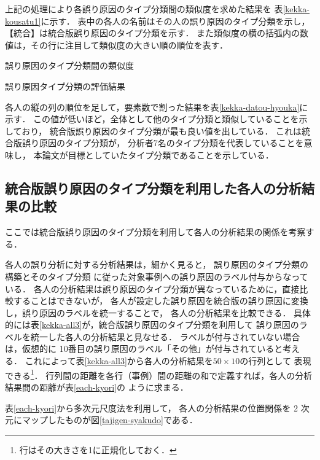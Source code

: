 \documentclass[japanese]{jnlp_1.4}
\begin{document}
上記の処理により各誤り原因のタイプ分類間の類似度を求めた結果を
\mbox{表\ref{kekka-kousatu1}}に示す．
表中の各人の名前はその人の誤り原因のタイプ分類を示し，【統合】は統合版誤り原因のタイプ分類を示す．
また類似度の横の括弧内の数値は，その行に注目して類似度の大きい順の順位を表す．


\begin{table}[t]
\caption{誤り原因のタイプ分類間の類似度}
\label{kekka-kousatu1}

\end{table}
\begin{table}[t]
\caption{誤り原因タイプ分類の評価結果}
\label{kekka-datou-hyouka}

\end{table}

各人の縦の列の順位を足して，要素数で割った結果を\mbox{表\ref{kekka-datou-hyouka}}に示す．
この値が低いほど，全体として他のタイプ分類と類似していることを示しており，
統合版誤り原因のタイプ分類が最も良い値を出している．
これは統合版誤り原因のタイプ分類が，
分析者7名のタイプ分類を代表していることを意味し，
本論文が目標としていたタイプ分類であることを示している．


\subsection{統合版誤り原因のタイプ分類を利用した各人の分析結果の比較}

ここでは統合版誤り原因のタイプ分類を利用して各人の分析結果の関係を考察する．

各人の誤り分析に対する分析結果は，細かく見ると，
誤り原因のタイプ分類の構築とそのタイプ分類
に従った対象事例への誤り原因のラベル付与からなっている．
各人の分析結果は誤り原因のタイプ分類が異なっているために，直接比較することはできないが，
各人が設定した誤り原因を統合版の誤り原因に変換し，誤り原因のラベルを統一することで，
各人の分析結果を比較できる．
具体的には\mbox{表\ref{kekka-all3}}が，統合版誤り原因のタイプ分類を利用して
誤り原因のラベルを統一した各人の分析結果と見なせる．
ラベルが付与されていない場合は，仮想的に 10番目の誤り原因のラベル「その他」が付与されていると考える．
これによって\mbox{表\ref{kekka-all3}}から各人の分析結果を$50 \times 10$の行列として
表現できる\footnote{行はその大きさを1に正規化しておく．}．
行列間の距離を各行（事例）間の距離の和で定義すれば，各人の分析結果間の距離が\mbox{表\ref{each-kyori}}の
ように求まる．

\mbox{表\ref{each-kyori}}から多次元尺度法を利用して，
各人の分析結果の位置関係を 2 次元にマップしたものが\mbox{図\ref{tajigen-syakudo}}である．
\end{document}
